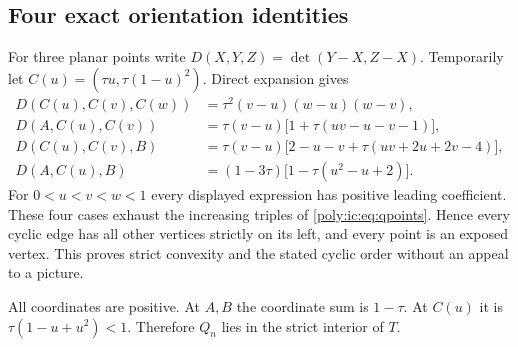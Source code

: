 \documentclass[11pt,a4paper]{article}
\numberwithin{equation}{section}
\theoremstyle{plain}
\begin{document}
\subsection{Four exact orientation identities}
For three planar points write
$D(X,Y,Z)=\det(Y-X,Z-X)$. Temporarily let
$C(u)=(\tau u,\tau(1-u)^2)$. Direct expansion gives
\begin{align}
 D(C(u),C(v),C(w))
   &=\tau^2(v-u)(w-u)(w-v),\label{poly:ic:eq:orientation1}\\
 D(A,C(u),C(v))
   &=\tau(v-u)\bigl[1+\tau(uv-u-v-1)\bigr],\label{poly:ic:eq:orientation2}\\
 D(C(u),C(v),B)
   &=\tau(v-u)\bigl[2-u-v+
                \tau(uv+2u+2v-4)\bigr],\label{poly:ic:eq:orientation3}\\
 D(A,C(u),B)
   &=(1-3\tau)\bigl[1-\tau(u^2-u+2)\bigr].\label{poly:ic:eq:orientation4}
\end{align}
For $0<u<v<w<1$ every displayed expression has positive leading
coefficient. These four cases exhaust the increasing triples of
\eqref{poly:ic:eq:qpoints}. Hence every cyclic edge has all other vertices strictly
on its left, and every point is an exposed vertex. This proves strict
convexity and the stated cyclic order without an appeal to a picture.

All coordinates are positive. At $A,B$ the coordinate sum is $1-\tau$.
At $C(u)$ it is $\tau(1-u+u^2)<1$. Therefore $Q_n$ lies in the strict
interior of $T$.
\end{document}
